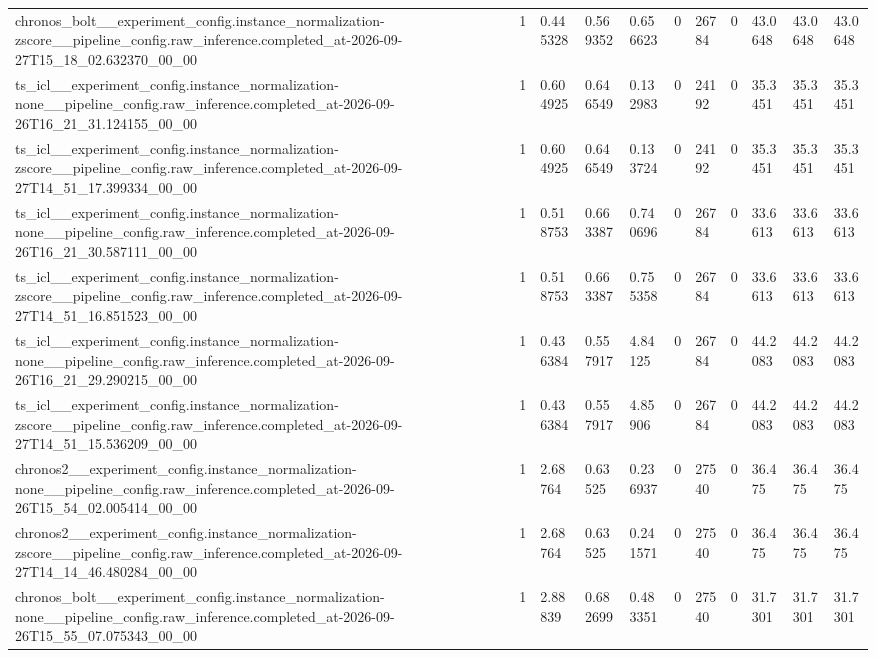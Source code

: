 \begin{tabular}{lllllllllll}
chronos\_bolt\_\_experiment\_config.instance\_normalization-zscore\_\_pipeline\_config.raw\_inference.completed\_at-2026-09-27T15\_18\_02.632370\_00\_00 & 1 & 0.445328 & 0.569352 & 0.656623 & 0 & 26784 & 0 & 43.0648 & 43.0648 & 43.0648 \\
ts\_icl\_\_experiment\_config.instance\_normalization-none\_\_pipeline\_config.raw\_inference.completed\_at-2026-09-26T16\_21\_31.124155\_00\_00 & 1 & 0.604925 & 0.646549 & 0.132983 & 0 & 24192 & 0 & 35.3451 & 35.3451 & 35.3451 \\
ts\_icl\_\_experiment\_config.instance\_normalization-zscore\_\_pipeline\_config.raw\_inference.completed\_at-2026-09-27T14\_51\_17.399334\_00\_00 & 1 & 0.604925 & 0.646549 & 0.133724 & 0 & 24192 & 0 & 35.3451 & 35.3451 & 35.3451 \\
ts\_icl\_\_experiment\_config.instance\_normalization-none\_\_pipeline\_config.raw\_inference.completed\_at-2026-09-26T16\_21\_30.587111\_00\_00 & 1 & 0.518753 & 0.663387 & 0.740696 & 0 & 26784 & 0 & 33.6613 & 33.6613 & 33.6613 \\
ts\_icl\_\_experiment\_config.instance\_normalization-zscore\_\_pipeline\_config.raw\_inference.completed\_at-2026-09-27T14\_51\_16.851523\_00\_00 & 1 & 0.518753 & 0.663387 & 0.755358 & 0 & 26784 & 0 & 33.6613 & 33.6613 & 33.6613 \\
ts\_icl\_\_experiment\_config.instance\_normalization-none\_\_pipeline\_config.raw\_inference.completed\_at-2026-09-26T16\_21\_29.290215\_00\_00 & 1 & 0.436384 & 0.557917 & 4.84125 & 0 & 26784 & 0 & 44.2083 & 44.2083 & 44.2083 \\
ts\_icl\_\_experiment\_config.instance\_normalization-zscore\_\_pipeline\_config.raw\_inference.completed\_at-2026-09-27T14\_51\_15.536209\_00\_00 & 1 & 0.436384 & 0.557917 & 4.85906 & 0 & 26784 & 0 & 44.2083 & 44.2083 & 44.2083 \\
chronos2\_\_experiment\_config.instance\_normalization-none\_\_pipeline\_config.raw\_inference.completed\_at-2026-09-26T15\_54\_02.005414\_00\_00 & 1 & 2.68764 & 0.63525 & 0.236937 & 0 & 27540 & 0 & 36.475 & 36.475 & 36.475 \\
chronos2\_\_experiment\_config.instance\_normalization-zscore\_\_pipeline\_config.raw\_inference.completed\_at-2026-09-27T14\_14\_46.480284\_00\_00 & 1 & 2.68764 & 0.63525 & 0.241571 & 0 & 27540 & 0 & 36.475 & 36.475 & 36.475 \\
chronos\_bolt\_\_experiment\_config.instance\_normalization-none\_\_pipeline\_config.raw\_inference.completed\_at-2026-09-26T15\_55\_07.075343\_00\_00 & 1 & 2.88839 & 0.682699 & 0.483351 & 0 & 27540 & 0 & 31.7301 & 31.7301 & 31.7301 \\

\end{tabular}
